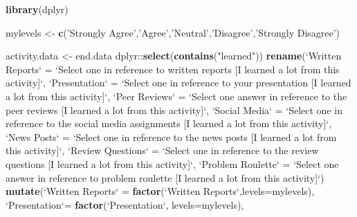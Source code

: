 \documentclass[]{article}
\newenvironment{Shaded}{\begin{snugshade}}{\end{snugshade}}
\newcommand{\KeywordTok}[1]{\textcolor[rgb]{0.13,0.29,0.53}{\textbf{{#1}}}}
\newcommand{\DataTypeTok}[1]{\textcolor[rgb]{0.13,0.29,0.53}{{#1}}}
\newcommand{\StringTok}[1]{\textcolor[rgb]{0.31,0.60,0.02}{{#1}}}
\newcommand{\NormalTok}[1]{{#1}}
\begin{document}
\begin{Shaded}
\begin{Highlighting}[]
\KeywordTok{library}\NormalTok{(dplyr)}

\NormalTok{mylevels <-}\StringTok{ }\KeywordTok{c}\NormalTok{(}\StringTok{'Strongly Agree'}\NormalTok{,}\StringTok{'Agree'}\NormalTok{,}\StringTok{'Neutral'}\NormalTok{,}\StringTok{'Disagree'}\NormalTok{,}\StringTok{'Strongly Disagree'}\NormalTok{)}


\NormalTok{activity.data <-}\StringTok{ }
\StringTok{  }\NormalTok{end.data %
\StringTok{  }\NormalTok{dplyr::}\KeywordTok{select}\NormalTok{(}\KeywordTok{contains}\NormalTok{(}\StringTok{"learned"}\NormalTok{)) %
\StringTok{  }\KeywordTok{rename}\NormalTok{(}\StringTok{`}\DataTypeTok{Written Reports}\StringTok{`} \NormalTok{=}\StringTok{ `}\DataTypeTok{Select one in reference to written reports [I learned a lot from this activity]}\StringTok{`}\NormalTok{,}
         \StringTok{`}\DataTypeTok{Presentation}\StringTok{`} \NormalTok{=}\StringTok{ `}\DataTypeTok{Select one in reference to your presentation [I learned a lot from this activity]}\StringTok{`}\NormalTok{,}
         \StringTok{`}\DataTypeTok{Peer Reviews}\StringTok{`} \NormalTok{=}\StringTok{ `}\DataTypeTok{Select one answer in reference to the peer reviews [I learned a lot from this activity]}\StringTok{`}\NormalTok{,}
         \StringTok{`}\DataTypeTok{Social Media}\StringTok{`} \NormalTok{=}\StringTok{ `}\DataTypeTok{Select one in reference to the social media assignments [I learned a lot from this activity]}\StringTok{`}\NormalTok{,}
         \StringTok{`}\DataTypeTok{News Posts}\StringTok{`} \NormalTok{=}\StringTok{ `}\DataTypeTok{Select one in reference to the news posts [I learned a lot from this activity]}\StringTok{`}\NormalTok{,}
         \StringTok{`}\DataTypeTok{Review Questions}\StringTok{`} \NormalTok{=}\StringTok{ `}\DataTypeTok{Select one in reference to the review questions [I learned a lot from this activity]}\StringTok{`}\NormalTok{,}
         \StringTok{`}\DataTypeTok{Problem Roulette}\StringTok{`} \NormalTok{=}\StringTok{ `}\DataTypeTok{Select one answer in reference to problem roulette [I learned a lot from this activity]}\StringTok{`}\NormalTok{) %
\StringTok{  }\KeywordTok{mutate}\NormalTok{(}\StringTok{`}\DataTypeTok{Written Reports}\StringTok{`} \NormalTok{=}\StringTok{ }\KeywordTok{factor}\NormalTok{(}\StringTok{`}\DataTypeTok{Written Reports}\StringTok{`}\NormalTok{,}\DataTypeTok{levels=}\NormalTok{mylevels),}
         \StringTok{`}\DataTypeTok{Presentation}\StringTok{`}\NormalTok{=}\StringTok{ }\KeywordTok{factor}\NormalTok{(}\StringTok{`}\DataTypeTok{Presentation}\StringTok{`}\NormalTok{, }\DataTypeTok{levels=}\NormalTok{mylevels),}
}}}
\end{Highlighting}
\end{Shaded}
\end{document}

